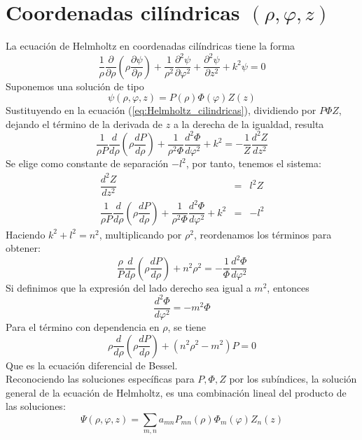 \section{Coordenadas cilíndricas $(\rho, \varphi, z)$}
La ecuación de Helmholtz en coordenadas cilíndricas tiene la forma
\begin{equation}
\dfrac{1}{\rho} \dfrac{\partial}{\partial \rho} \left( \rho \dfrac{\partial \psi}{\partial \rho}  \right) + \dfrac{1}{\rho^{2}} \dfrac{\partial^{2} \psi}{\partial \varphi^{2}} + \dfrac{\partial^{2} \psi}{\partial z^{2}} + k^{2} \psi = 0  \label{eq:Helmholtz_cilindricas}
\end{equation}
Suponemos una solución de tipo
\begin{equation}
\psi(\rho, \varphi,z) = P(\rho) \Phi (\varphi) Z(z) \label{eq:sol_prop_cilindricas}
\end{equation}
Sustituyendo en la ecuación (\ref{eq:Helmholtz_cilindricas}), dividiendo por $P \Phi Z$, dejando el término de la derivada de $z$ a la derecha de la igualdad, resulta
\begin{equation}
\dfrac{1}{\rho P} \dfrac{d}{d \rho} \left( \rho \dfrac{dP}{d \rho} \right) + \dfrac{1}{\rho^{2} \Phi} \dfrac{d^{2} \Phi}{d \varphi^{2}} + k^{2} =  - \dfrac{1}{Z} \dfrac{d^{2} Z}{dz^{2}} \label{eq:Helmholtz_separada}
\end{equation}
Se elige como constante de separación  $-l^{2}$, por tanto, tenemos el sistema:
\begin{eqnarray}
\dfrac{d^{2} Z}{d z^{2}} &=& l^{2} Z \\
\dfrac{1}{\rho P} \dfrac{d}{d \rho} \left( \rho \dfrac{d P}{d \rho} \right) + \dfrac{1}{\rho^{2} \Phi} \dfrac{d^{2} \Phi}{d \varphi^{2}} + k^{2} &=& - l^{2}
\end{eqnarray}
Haciendo $k^{2} + l^{2} = n^{2}$, multiplicando por $\rho^{2}$, reordenamos los términos para obtener:
\begin{equation}
\dfrac{\rho}{P} \dfrac{d}{d \rho} \left( \rho \dfrac{d P}{d \rho} \right) + n^{2} \rho^{2} = - \dfrac{1}{\Phi} \dfrac{d^{2} \Phi}{d \varphi^{2}}
\end{equation}
Si definimos que la expresión del lado derecho sea igual a $m^{2}$, entonces
\begin{equation}
\dfrac{d^{2} \Phi}{d \varphi^{2}} = - m^{2} \Phi
\end{equation}
Para el término con dependencia en $\rho$, se tiene
\begin{equation}
\rho \dfrac{d}{d \rho} \left( \rho \dfrac{d P}{d \rho} \right) + (n^{2} \rho^{2} - m^{2} ) P = 0 \label{eq:ecuacion_Bessel}
\end{equation}
Que es la ecuación diferencial de Bessel.
\\
Reconociendo las soluciones específicas para $P, \Phi, Z$ por los subíndices, la solución general de la ecuación de Helmholtz, es una combinación lineal del producto de las soluciones:
\begin{equation}
\Psi(\rho, \varphi, z) =  \sum_{m,n} a_{mn} P_{mn}(\rho) \Phi_{m}(\varphi) Z_{n}(z)
\end{equation}
